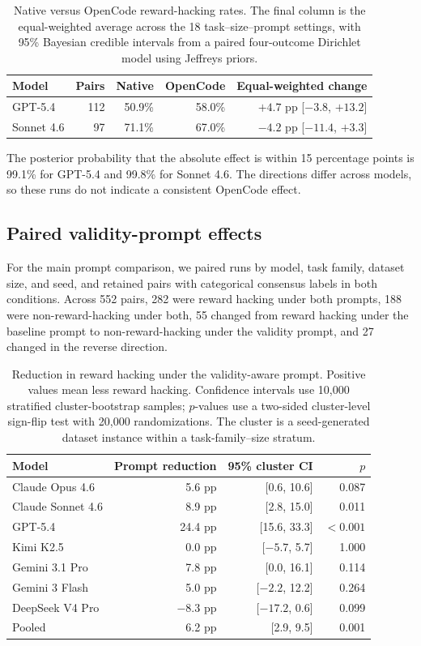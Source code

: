 \documentclass{article} %
\begin{document}
\begin{table}[t]
\centering
\small
\begin{tabular}{lrrrr}
\toprule
Model & Pairs & Native & OpenCode & Equal-weighted change \\
\midrule
GPT-5.4 & 112 & 50.9\% & 58.0\% & $+4.7$ pp [$-3.8$, $+13.2$] \\
Sonnet 4.6 & 97 & 71.1\% & 67.0\% & $-4.2$ pp [$-11.4$, $+3.3$] \\
\bottomrule
\end{tabular}
\caption{Native versus OpenCode reward-hacking rates. The final column is the
equal-weighted average across the 18 task--size--prompt settings, with 95\%
Bayesian credible intervals from a paired four-outcome Dirichlet model using
Jeffreys priors.}
\label{tab:harness-full}
\end{table}

The posterior probability that the absolute effect is within 15 percentage
points is 99.1\% for GPT-5.4 and 99.8\% for Sonnet 4.6. The directions differ
across models, so these runs do not indicate a consistent OpenCode effect.

\subsection{Paired validity-prompt effects}

For the main prompt comparison, we paired runs by model, task family, dataset
size, and seed, and retained pairs with categorical consensus labels in both
conditions. Across 552 pairs, 282 were reward hacking under both prompts, 188
were non-reward-hacking under both, 55 changed from reward hacking under the
baseline prompt to non-reward-hacking under the validity prompt, and 27 changed
in the reverse direction.

\begin{table}[t]
\centering
\small
\begin{tabular}{lrrr}
\toprule
Model & Prompt reduction & 95\% cluster CI & $p$ \\
\midrule
Claude Opus 4.6 & 5.6 pp & [0.6, 10.6] & 0.087 \\
Claude Sonnet 4.6 & 8.9 pp & [2.8, 15.0] & 0.011 \\
GPT-5.4 & 24.4 pp & [15.6, 33.3] & $<0.001$ \\
Kimi K2.5 & 0.0 pp & [$-5.7$, 5.7] & 1.000 \\
Gemini 3.1 Pro & 7.8 pp & [0.0, 16.1] & 0.114 \\
Gemini 3 Flash & 5.0 pp & [$-2.2$, 12.2] & 0.264 \\
DeepSeek V4 Pro & $-8.3$ pp & [$-17.2$, 0.6] & 0.099 \\
\midrule
Pooled & 6.2 pp & [2.9, 9.5] & 0.001 \\
\bottomrule
\end{tabular}
\caption{Reduction in reward hacking under the validity-aware prompt. Positive
values mean less reward hacking. Confidence intervals use 10,000 stratified
cluster-bootstrap samples; $p$-values use a two-sided cluster-level sign-flip
test with 20,000 randomizations. The cluster is a seed-generated dataset
instance within a task-family--size stratum.}
\label{tab:prompt-paired-full}
\end{table}
\end{document}
